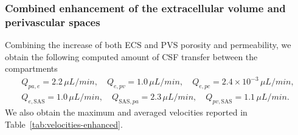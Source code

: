 \documentclass[10pt]{article}
\newcommand{\JR}[1]{\textcolor{orange}{JR: #1}}
\newcommand{\1}{^{(1)}}
\newcommand{\2}{^{(2)}}
\begin{document}


\subsubsection{Combined enhancement of the extracellular volume and perivascular spaces}
\label{subsec:combined-res}


Combining the increase of both ECS and PVS porosity and permeability, we obtain the following computed amount of CSF transfer between the compartments
\[
\begin{aligned}
    Q_{pa,e} = 2.2 \, \si{\mu L/min},\quad Q_{e,pv} = 1.0 \,  \si{\mu L/min},\quad Q_{e,pc} = 2.4\times 10^{-3} \, \si{\mu L/min}, \\
    Q_{e,\text{SAS}} = 1.0 \, \si{\mu L/min} , \quad Q_{\text{SAS},pa} = 2.3 \, \si{\mu L/min},\quad Q_{pv,\text{SAS}} = 1.1 \, \si{\mu L/min}.
\end{aligned}
\]
We also obtain the maximum and averaged velocities reported in Table~\ref{tab:velocities-enhanced}. 
\end{document}
